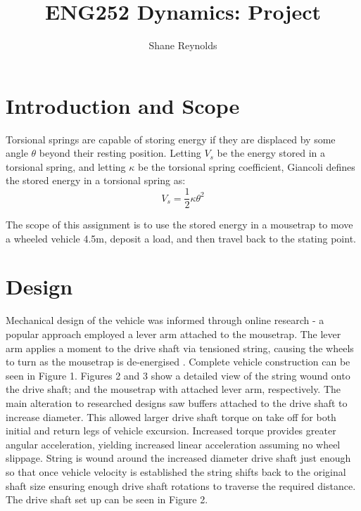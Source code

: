 \documentclass[a4paper]{article}
\begin{document}
\title{ENG252 Dynamics: Project}
\author{Shane Reynolds}
\maketitle

\section{Introduction and Scope}
Torsional springs are capable of storing energy if they are displaced by some angle $\theta$ beyond their resting position. Letting $V_s$ be the energy stored in a torsional spring, and letting $\kappa$ be the torsional spring coefficient, Giancoli \cite{Giancoli:2000} defines the stored energy in a torsional spring as:
\begin{equation}
	V_s = \frac{1}{2} \kappa \theta^2
\end{equation}

The scope of this assignment is to use the stored energy in a mousetrap to move a wheeled vehicle 4.5$\si{\meter}$, deposit a load, and then travel back to the stating point.

\section{Design}
Mechanical design of the vehicle was informed through online research - a popular approach employed a lever arm attached to the mousetrap. The lever arm applies a moment to the drive shaft via tensioned string, causing the wheels to turn as the mousetrap is de-energised \cite{doc_fiz}. Complete vehicle construction can be seen in Figure 1. Figures 2 and 3 show a detailed view of the string wound onto the drive shaft; and the mousetrap with attached lever arm, respectively. The main alteration to researched designs saw buffers attached to the drive shaft to increase diameter. This allowed larger drive shaft torque on take off for both initial and return legs of vehicle excursion. Increased torque provides greater angular acceleration, yielding increased linear acceleration assuming no wheel slippage. String is wound around the increased diameter drive shaft just enough so that once vehicle velocity is established the string shifts back to the original shaft size ensuring enough drive shaft rotations to traverse the required distance. The drive shaft set up can be seen in Figure 2.
\end{document}
